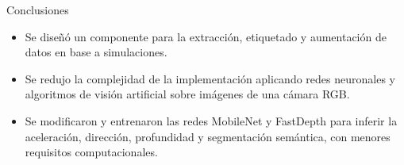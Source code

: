 \documentclass[10pt, usepdftitle=false]{beamer}
\begin{document}
\begin{frame}[fragile]{Conclusiones}
	\begin{itemize}[<+-|alert@+>]
		\item Se diseñó un componente para la extracción, etiquetado y aumentación de datos en base a simulaciones.
		
		\item Se redujo la complejidad de la implementación aplicando redes neuronales y algoritmos de visión artificial sobre imágenes de una cámara RGB.
		
		\item Se modificaron y entrenaron las redes MobileNet y FastDepth para inferir la aceleración, dirección, profundidad y segmentación semántica, con menores requisitos computacionales.
	\end{itemize}
\end{frame}
\end{document}
